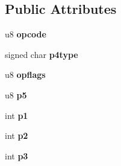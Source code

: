 \subsection*{Public Attributes}
\begin{DoxyCompactItemize}
\item 
\hypertarget{struct_vdbe_op_ae12a8e7a8f5f7ba39fa379c9ad287837}{u8 {\bfseries opcode}}\label{struct_vdbe_op_ae12a8e7a8f5f7ba39fa379c9ad287837}

\item 
\hypertarget{struct_vdbe_op_a124dee58d3e0d73c7dfaf811a3311023}{signed char {\bfseries p4type}}\label{struct_vdbe_op_a124dee58d3e0d73c7dfaf811a3311023}

\item 
\hypertarget{struct_vdbe_op_a169a7bbe99a90c26ee01833723750b1d}{u8 {\bfseries opflags}}\label{struct_vdbe_op_a169a7bbe99a90c26ee01833723750b1d}

\item 
\hypertarget{struct_vdbe_op_a5e807981f52d29c06a5b6d4a8f2f4595}{u8 {\bfseries p5}}\label{struct_vdbe_op_a5e807981f52d29c06a5b6d4a8f2f4595}

\item 
\hypertarget{struct_vdbe_op_a17c8326a1e3ac5612d4aaaa88f383b3b}{int {\bfseries p1}}\label{struct_vdbe_op_a17c8326a1e3ac5612d4aaaa88f383b3b}

\item 
\hypertarget{struct_vdbe_op_aba021fa9d30343c16794d9b76d8bffcd}{int {\bfseries p2}}\label{struct_vdbe_op_aba021fa9d30343c16794d9b76d8bffcd}

\item 
\hypertarget{struct_vdbe_op_ad7ef3319da20d5423b8cc5da6995d193}{int {\bfseries p3}}\label{struct_vdbe_op_ad7ef3319da20d5423b8cc5da6995d193}


\end{DoxyCompactItemize}

